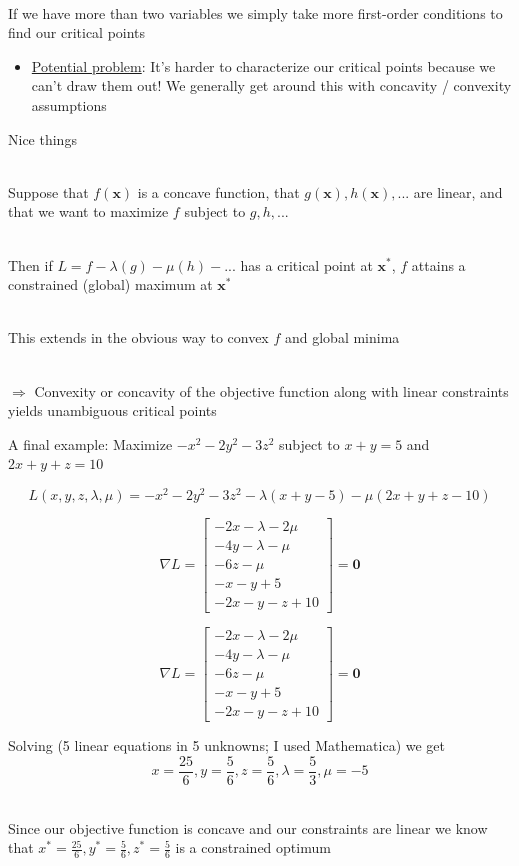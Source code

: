 \documentclass[10pt]{seminar}
\begin{document}
\begin{slide}
\ \\If we have more than two variables we simply take more first-order conditions to find our critical points

\begin{itemize}
\item \underline{Potential problem}: It's harder to characterize our critical points because we can't draw them out!  We generally get around this with concavity / convexity assumptions
\end{itemize}

\newslide
Nice things

\ \\Suppose that $f(\mathbf{x})$ is a concave function, that $g(\mathbf{x}), h(\mathbf{x}), ... $ are linear, and that we want to maximize $f$ subject to $g, h, ...$

\ \\Then if $L=f-\lambda(g)-\mu(h)-...$ has a critical point at $\mathbf{x}^*$, $f$ attains a constrained (global) maximum at $\mathbf{x}^*$

\ \\This extends in the obvious way to convex $f$ and global minima

\ \\$\Rightarrow$ Convexity or concavity of the objective function along with linear constraints yields unambiguous critical points

\newslide

A final example: Maximize $-x^2-2y^2-3z^2$ subject to $x+y=5$ and $2x+y+z=10$

$$L(x, y, z, \lambda, \mu)=-x^2-2y^2-3z^2-\lambda(x+y-5)-\mu(2x+y+z-10)$$

$$\nabla L=\begin{bmatrix}
-2x-\lambda-2\mu\\
-4y-\lambda-\mu\\
-6z-\mu\\
-x-y+5\\
-2x-y-z+10
\end{bmatrix} =\mathbf{0}$$

\newslide
$$\nabla L=\begin{bmatrix}
-2x-\lambda-2\mu\\
-4y-\lambda-\mu\\
-6z-\mu\\
-x-y+5\\
-2x-y-z+10
\end{bmatrix} =\mathbf{0}$$

Solving (5 linear equations in 5 unknowns; I used Mathematica) we get $$x= \frac{25}{6},y = \frac{5}{6},z= \frac{5}{6},\lambda= \frac{5}{3},\mu= -5$$

\ \\Since our objective function is concave and our constraints are linear we know that  $x^*= \frac{25}{6},y^* = \frac{5}{6},z^*= \frac{5}{6}$ is a constrained optimum 

 \end{slide}
 
 
\end{document}
